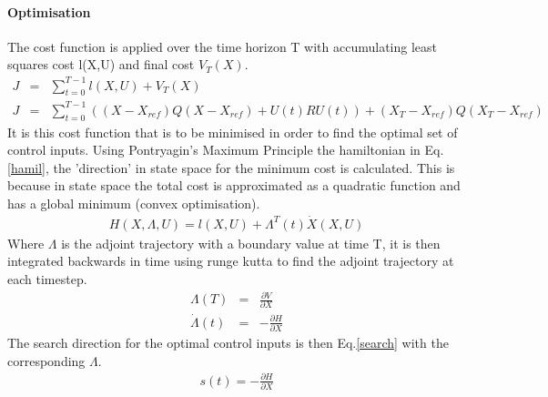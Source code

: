 \documentclass[MTRX3700report.tex]{subfiles}
\begin{document}
\paragraph{Optimisation}
 The cost function is applied over the time horizon T with accumulating least squares cost l(X,U) and final cost $V_T(X)$.
 \begin{eqnarray}
 J &=& \sum_{t = 0}^{T-1}  l(X,U)  + V_T(X)\\
 J &=& \sum_{t = 0}^{T-1} \left( (X-X_{ref})Q(X-X_{ref})+U(t)RU(t) \right) + (X_T-X_{ref})Q(X_T-X_{ref})
 \end{eqnarray}
 It is this cost function that is to be minimised in order to find the optimal set of control inputs. Using Pontryagin's Maximum Principle the hamiltonian in Eq.\eqref{hamil}, the 'direction' in state space for the minimum cost is calculated. This is because in state space the total cost is approximated as a quadratic function and has a global minimum (convex optimisation). 
 \begin{eqnarray}
 H(X,\Lambda,U) = l(X,U)+\Lambda^T(t)\dot{X}(X,U) \label{hamil}
 \end{eqnarray}
  Where $\Lambda$ is the adjoint trajectory with a boundary value at time T, it is then integrated backwards in time using runge kutta to find the adjoint trajectory at each timestep.
 \begin{eqnarray}
 \Lambda(T) &=& \frac{\partial V}{\partial X}\\
 \dot{\Lambda}(t) &=& -\frac{\partial H}{\partial X}
 \end{eqnarray}
 The search direction for the optimal control inputs is then Eq.\eqref{search} with the corresponding $\Lambda$.
 \begin{eqnarray}
 s(t) = -\frac{\partial H}{\partial X} \label{search}
 \end{eqnarray}
 
\end{document}
